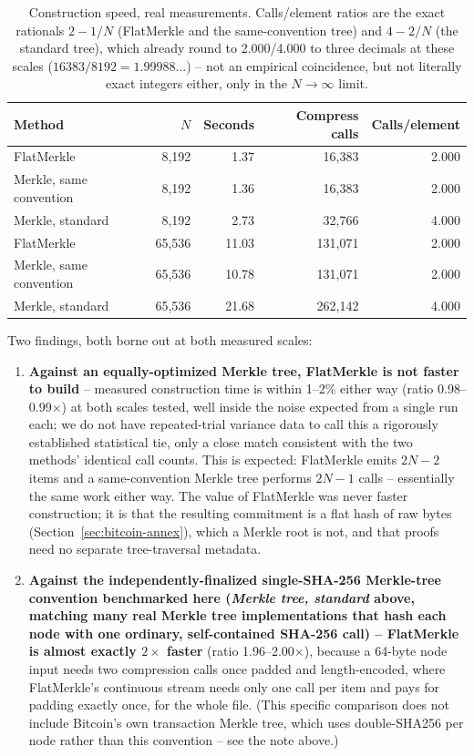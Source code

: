 \begin{table}[htbp]
\centering
\begin{tabular}{@{}lrrrr@{}}
\toprule
Method & $N$ & Seconds & Compress calls & Calls/element \\
\midrule
FlatMerkle              & 8{,}192  &  1.37 & 16{,}383 & 2.000 \\
Merkle, same convention & 8{,}192  &  1.36 & 16{,}383 & 2.000 \\
Merkle, standard        & 8{,}192  &  2.73 & 32{,}766 & 4.000 \\
\midrule
FlatMerkle              & 65{,}536 & 11.03 & 131{,}071 & 2.000 \\
Merkle, same convention & 65{,}536 & 10.78 & 131{,}071 & 2.000 \\
Merkle, standard        & 65{,}536 & 21.68 & 262{,}142 & 4.000 \\
\bottomrule
\end{tabular}
\caption{Construction speed, real measurements. Calls/element ratios are
the exact rationals $2-1/N$ (FlatMerkle and the same-convention tree) and
$4-2/N$ (the standard tree), which already round to 2.000/4.000 to three
decimals at these scales ($16383/8192 = 1.99988\ldots$) -- not an
empirical coincidence, but not literally exact integers either, only in
the $N \to \infty$ limit.}
\label{tab:benchmark}
\end{table}

Two findings, both borne out at both measured scales:

\begin{enumerate}
\item \textbf{Against an equally-optimized Merkle tree, FlatMerkle is not
  faster to build} -- measured construction time is within 1--2\% either
  way (ratio 0.98--0.99$\times$) at both scales tested, well inside the
  noise expected from a single run each; we do not have repeated-trial
  variance data to call this a rigorously established statistical tie,
  only a close match consistent with the two methods' identical call
  counts. This is expected: FlatMerkle emits $2N-2$ items and a
  same-convention Merkle tree performs $2N-1$ calls -- essentially the same
  work either way. The value of FlatMerkle was never faster construction;
  it is that the resulting commitment is a flat hash of raw bytes
  (Section~\ref{sec:bitcoin-annex}), which a Merkle root is not, and that
  proofs need no separate tree-traversal metadata.
\item \textbf{Against the independently-finalized single-SHA-256
  Merkle-tree convention benchmarked here (\emph{Merkle tree, standard}
  above, matching many real Merkle tree implementations that hash each
  node with one ordinary, self-contained SHA-256 call) -- FlatMerkle is
  almost exactly $2\times$ faster} (ratio 1.96--2.00$\times$), because a
  64-byte node input needs two compression calls once padded and
  length-encoded, where FlatMerkle's continuous stream needs only one call
  per item and pays for padding exactly once, for the whole file. (This
  specific comparison does not include Bitcoin's own transaction Merkle
  tree, which uses double-SHA256 per node rather than this convention --
  see the note above.)
\end{enumerate}

